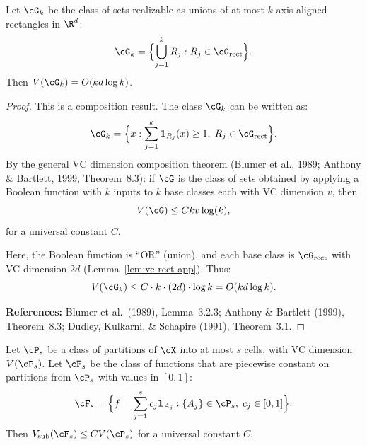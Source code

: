 \documentclass[12pt]{article}
\begin{document}
\begin{lemma}
\label{lem:vc-union-app}
Let $\cG_k$ be the class of sets realizable as unions of at most $k$ axis-aligned rectangles in $\R^d$:
\[
\cG_k = \Bigl\{ \bigcup_{j=1}^k R_j : R_j \in \cG_{\text{rect}} \Bigr\}.
\]
Then $V(\cG_k) = O(kd \log k)$.
\end{lemma}

\begin{proof}
This is a composition result. The class $\cG_k$ can be written as:
\[
\cG_k = \Bigl\{ x : \sum_{j=1}^k \mathbf{1}_{R_j}(x) \ge 1, \; R_j \in \cG_{\text{rect}} \Bigr\}.
\]
By the general VC dimension composition theorem (Blumer et al., 1989; Anthony \& Bartlett, 1999, Theorem~8.3): if $\cG$ is the class of sets obtained by applying a Boolean function with $k$ inputs to $k$ base classes each with VC dimension $v$, then
\[
V(\cG) \le C k v \log(k),
\]
for a universal constant $C$.

Here, the Boolean function is ``OR'' (union), and each base class is $\cG_{\text{rect}}$ with VC dimension $2d$ (Lemma~\ref{lem:vc-rect-app}). Thus:
\[
V(\cG_k) \le C \cdot k \cdot (2d) \cdot \log k = O(kd \log k).
\]

\textbf{References:} Blumer et al.\ (1989), Lemma~3.2.3; Anthony \& Bartlett (1999), Theorem~8.3; Dudley, Kulkarni, \& Schapire (1991), Theorem~3.1.
\end{proof}

\begin{lemma}
\label{lem:pseudo-partition}
Let $\cP_s$ be a class of partitions of $\cX$ into at most $s$ cells, with VC dimension $V(\cP_s)$. Let $\cF_s$ be the class of functions that are piecewise constant on partitions from $\cP_s$ with values in $[0,1]$:
\[
\cF_s = \Bigl\{ f = \sum_{j=1}^s c_j \mathbf{1}_{A_j} : \{A_j\} \in \cP_s, \; c_j \in [0,1] \Bigr\}.
\]
Then $V_{\text{sub}}(\cF_s) \le C V(\cP_s)$ for a universal constant $C$.
\end{lemma}
\end{document}
